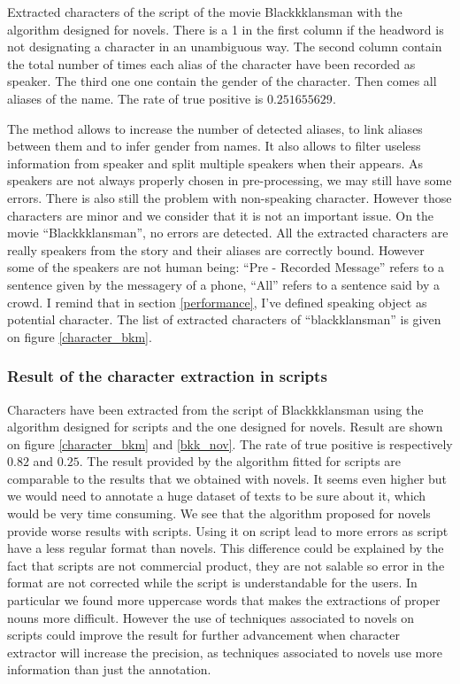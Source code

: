 \documentclass[a4paper, 12pt]{report}
\begin{document}
\begin{table}[]
\caption{Extracted characters of the script of the movie Blackkklansman with the algorithm designed for novels. There is a 1 in the first column if the headword is not designating a character in an unambiguous way. The second column contain the total number of times each alias of the character have been recorded as speaker. The third one one contain the gender of the character. Then comes all aliases of the name. The rate of true positive is $0.251655629$.}
 \label{bkk_nov}
\end{table}

The method allows to increase the number of detected aliases, to link aliases between them and to infer gender from names. It also allows to filter useless information from speaker and split multiple speakers when their appears. As speakers are not always properly chosen in pre-processing, we may still have some errors. There is also still the problem with non-speaking character. However those characters are minor and we consider that it is not an important issue.  On the movie ``Blackkklansman'', no errors are detected. All the extracted characters are really speakers from the story and their aliases are correctly bound. However some of the speakers are not human being: ``Pre - Recorded Message'' refers to a sentence given by the messagery of a phone, ``All'' refers to a sentence said by a crowd. I remind that in section \ref{performance}, I've defined speaking object as potential character. The list of extracted characters of ``blackklansman'' is given on figure \ref{character_bkm}.\\


\subsubsection{Result of the character extraction in scripts}
Characters have been extracted from the script of Blackkklansman using the algorithm designed for scripts and the one designed for novels. Result are shown on figure \ref{character_bkm} and \ref{bkk_nov}. The rate of true positive is respectively $0.82$ and $0.25$. The result provided by the algorithm fitted for scripts are comparable to the results that we obtained with novels. It seems even higher but we would need to annotate a huge dataset of texts to be sure about it, which would be very time consuming.  We see that the algorithm proposed for novels provide worse results with scripts. Using it on script lead to more errors as script have a less regular format than novels. This difference could be explained by the fact that scripts are not commercial product, they are not salable so error in the format are not corrected while the script is understandable for the users. In particular we found more uppercase words that makes the extractions of proper nouns more difficult. However the use of techniques associated to novels on scripts could improve the result for further advancement when character extractor will increase the precision, as techniques associated to novels use more information than just the annotation.\\
\end{document}
